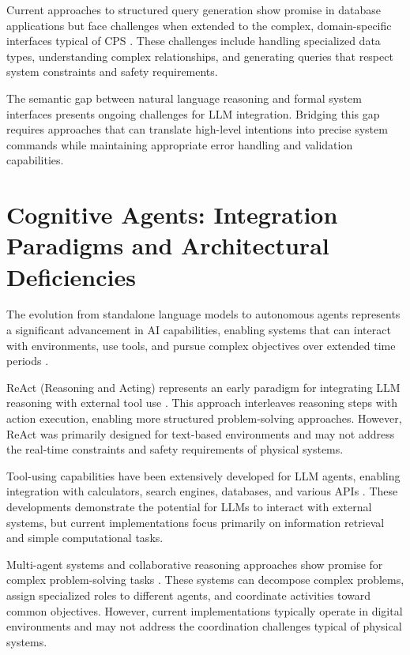 Current approaches to structured query generation show promise in database applications but face challenges when extended to the complex, domain-specific interfaces typical of CPS \cite{li2023can, liu2023comprehensive}. These challenges include handling specialized data types, understanding complex relationships, and generating queries that respect system constraints and safety requirements.

The semantic gap between natural language reasoning and formal system interfaces presents ongoing challenges for LLM integration. Bridging this gap requires approaches that can translate high-level intentions into precise system commands while maintaining appropriate error handling and validation capabilities.

\section{Cognitive Agents: Integration Paradigms and Architectural Deficiencies}

The evolution from standalone language models to autonomous agents represents a significant advancement in AI capabilities, enabling systems that can interact with environments, use tools, and pursue complex objectives over extended time periods \cite{yao2022react, schick2023toolformer, qin2023tool}.

ReAct (Reasoning and Acting) represents an early paradigm for integrating LLM reasoning with external tool use \cite{yao2022react}. This approach interleaves reasoning steps with action execution, enabling more structured problem-solving approaches. However, ReAct was primarily designed for text-based environments and may not address the real-time constraints and safety requirements of physical systems.

Tool-using capabilities have been extensively developed for LLM agents, enabling integration with calculators, search engines, databases, and various APIs \cite{schick2023toolformer, nakano2021webgpt}. These developments demonstrate the potential for LLMs to interact with external systems, but current implementations focus primarily on information retrieval and simple computational tasks.

Multi-agent systems and collaborative reasoning approaches show promise for complex problem-solving tasks \cite{wu2023autogen, hong2023metagpt}. These systems can decompose complex problems, assign specialized roles to different agents, and coordinate activities toward common objectives. However, current implementations typically operate in digital environments and may not address the coordination challenges typical of physical systems.

